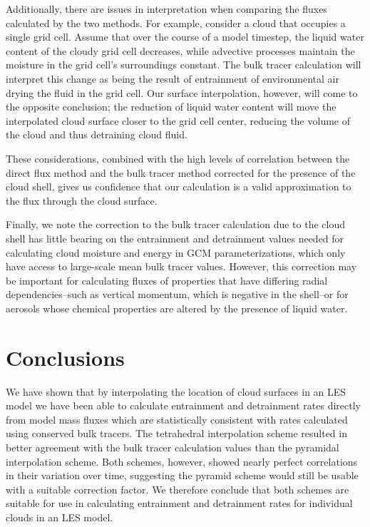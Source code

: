 \documentclass[12pt]{article}
\begin{document}
Additionally, there are issues in interpretation when comparing the fluxes
calculated by the two methods.  For example, consider a cloud that occupies a
single grid cell.  Assume that over the course of a model timestep, the liquid
water content of the cloudy grid cell decreases, while advective processes 
maintain the moisture in the grid cell's surroundings constant.  The bulk
tracer calculation will interpret this change as being the result of
entrainment of environmental air drying the fluid in the grid cell.  Our
surface interpolation, however, will come to the opposite conclusion; the
reduction of liquid water content will move the interpolated cloud surface
closer to the grid cell center, reducing the volume of the cloud and thus
detraining cloud fluid.

These considerations, combined with the high levels of correlation between 
the direct flux method and the bulk tracer method corrected for the presence
of the cloud shell, gives us confidence that our calculation is a valid
approximation to the flux through the cloud surface.

Finally, we note the correction to the bulk tracer calculation due to the cloud
shell has little bearing on the entrainment and detrainment values needed for 
calculating cloud moisture and energy in GCM parameterizations, which only have
access to large-scale mean bulk tracer values.  However, this correction may be
important for calculating fluxes of properties that have differing radial
dependencies--such as vertical momentum, which is negative in the shell--or for
aerosols whose chemical properties are altered by the presence of liquid
water.


\section{Conclusions}

We have shown that by interpolating the location of cloud surfaces in an LES
model we have been able to calculate entrainment and detrainment rates directly 
from model mass fluxes which are statistically consistent with rates calculated
using conserved bulk tracers.  The tetrahedral interpolation scheme resulted in
better agreement with the bulk tracer calculation values than the pyramidal
interpolation scheme.  Both schemes, however, showed nearly perfect 
correlations in their variation over time, suggesting the pyramid scheme would
still be usable with a suitable correction factor.  We therefore conclude that
both schemes are suitable for use in calculating entrainment and detrainment
rates for individual clouds in an LES model.
\end{document}
